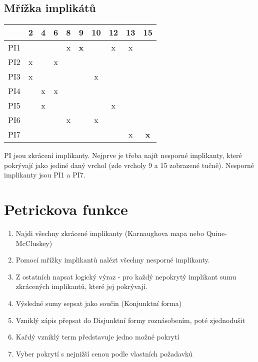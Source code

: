 \documentclass[a4paper, 11pt]{report}
\begin{document}
\subsection{Mřížka implikátů}

\begin{tabular}{| c || c | c | c | c | c | c | c | c | c |}
	\hline
		& 2 & 4 & 6 & 8 & 9 & 10 & 12 & 13 & 15 \\ \hline \hline
	PI1	&   &   &   & x & \textbf{x} &    & x  & x  &    \\ \hline
	PI2	& x &   & x &   &   &    &    &    &    \\ \hline
	PI3	& x &   &   &   &   & x  &    &    &    \\ \hline
	PI4	&   & x & x &   &   &    &    &    &    \\ \hline
	PI5	&   & x &   &   &   &    & x  &    &    \\ \hline
	PI6	&   &   &   & x &   & x  &    &    &    \\ \hline
	PI7	&   &   &   &   &   &    &    & x  & \textbf{x}  \\ \hline
\end{tabular}

PI jsou zkrácení implikanty. Nejprve je třeba najít nesporné implikanty, které pokrývají jako jediné daný vrchol (zde vrcholy 9 a 15 zobrazené tučně). Nesporné implikanty jsou PI1 a PI7.

\section{Petrickova funkce}

\begin{enumerate}
	\item Najdi všechny zkrácené implikanty (Karnaughova mapa nebo Quine-McCluskey)
	\item Pomocí mřížky implikantů nalézt všechny nesporné implikanty.
	\item Z ostatních napsat logický výraz - pro každý nepokrytý implikant sumu zkrácených implikantů, které jej pokrývají.
	\item Výsledné sumy sepsat jako součin (Konjunktní forma)
	\item Vzniklý zápis přepsat do Disjunktní formy roznásobením, poté zjednodušit
	\item Kařdý vzniklý term představuje jedno možné pokrytí
	\item Vyber pokrytí s nejnižší cenou podle vlastních požadavků
\end{enumerate}
\end{document}
